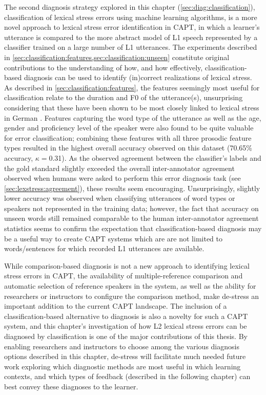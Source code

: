 	The second diagnosis strategy explored in this chapter (\cref{sec:diag:classification}), classification of lexical stress errors using machine learning algorithms, is a more novel approach to lexical stress error identification in CAPT, in which a learner's utterance is compared to the more abstract model of L1 speech represented by a classifier trained on a large number of L1 utterances. The experiments described in \cref{sec:classification:features,sec:classification:unseen} constitute original contributions to the understanding of how, and how effectively, classification-based diagnosis can be used to identify (in)correct realizations of lexical stress. As described in \cref{sec:classification:features}, the features seemingly most useful for classification relate to the duration and F0 of the utterance(s), unsurprising considering that these have been shown to be most closely linked to lexical stress in German \citep{Cutler2005,Dogil1999}. Features capturing the word type of the utterance as well as the age, gender and proficiency level of the speaker were also found to be quite valuable for error classification; combining these features with all three prosodic feature types resulted in the highest overall accuracy observed on this dataset (70.65\% accuracy, $\kappa=$0.31). As the observed agreement between the classifier's labels and the gold standard slightly exceeded the overall inter-annotator agreement observed when humans were asked to perform this error diagnosis task (see \cref{sec:lexstress:agreement}), these results seem encouraging. Unsurprisingly, slightly lower accuracy was observed when classifying utterances of word types or speakers not represented in the training data; however, the fact that accuracy on unseen words still remained comparable to the human inter-annotator agreement statistics seems to confirm the expectation that classification-based diagnosis may be a useful way to create CAPT systems which are are not limited to words/sentences for which recorded L1 utterances are available.
	
	
	While comparison-based diagnosis is not a new approach to identifying lexical stress errors in CAPT, the availability of multiple-reference comparison and automatic selection of reference speakers in the system, as well as the ability for researchers or instructors to configure the comparison method, make de-stress an important addition to the current CAPT landscape. The inclusion of a classification-based alternative to diagnosis is also a novelty for such a CAPT system, and this chapter's investigation of how L2 lexical stress errors can be diagnosed by classification is one of the major contributions of this thesis. By enabling researchers and instructors to choose among the various diagnosis options described in this chapter, de-stress will facilitate much needed future work exploring which diagnostic methods are most useful in which learning contexts, and which types of feedback (described in the following chapter) can best convey these diagnoses to the learner.